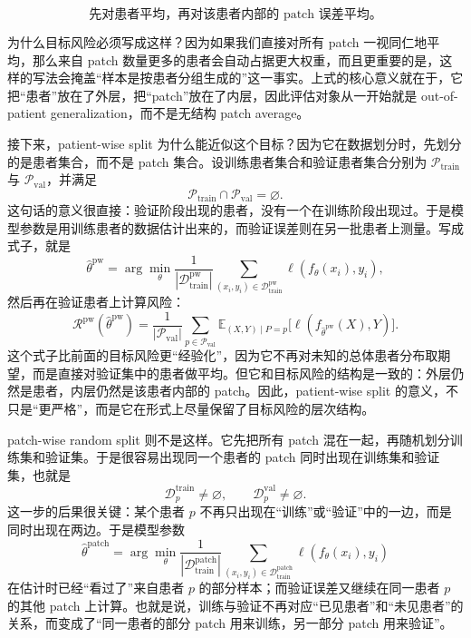 \begin{equation}
    \text{先对患者平均，再对该患者内部的 patch 误差平均。}
\end{equation}

为什么目标风险必须写成这样？因为如果我们直接对所有 patch 一视同仁地平均，那么来自 patch 数量更多的患者会自动占据更大权重，而且更重要的是，这样的写法会掩盖“样本是按患者分组生成的”这一事实。上式的核心意义就在于，它把“患者”放在了外层，把“patch”放在了内层，因此评估对象从一开始就是 out-of-patient generalization，而不是无结构 patch average。

接下来，patient-wise split 为什么能近似这个目标？因为它在数据划分时，先划分的是患者集合，而不是 patch 集合。设训练患者集合和验证患者集合分别为 $\mathcal{P}_{\mathrm{train}}$ 与 $\mathcal{P}_{\mathrm{val}}$，并满足
\begin{equation}
    \mathcal{P}_{\mathrm{train}} \cap \mathcal{P}_{\mathrm{val}} = \varnothing.
\end{equation}
这句话的意义很直接：验证阶段出现的患者，没有一个在训练阶段出现过。于是模型参数是用训练患者的数据估计出来的，而验证误差则在另一批患者上测量。写成式子，就是
\begin{equation}
    \hat{\theta}^{\mathrm{pw}}
    =
    \arg\min_{\theta}
    \frac{1}{|\mathcal{D}_{\mathrm{train}}^{\mathrm{pw}}|}
    \sum_{(x_i,y_i)\in\mathcal{D}_{\mathrm{train}}^{\mathrm{pw}}}
    \ell(f_{\theta}(x_i),y_i),
\end{equation}
然后再在验证患者上计算风险：
\begin{equation}
    \mathcal{R}^{\mathrm{pw}}(\hat{\theta}^{\mathrm{pw}})
    =
    \frac{1}{|\mathcal{P}_{\mathrm{val}}|}
    \sum_{p\in\mathcal{P}_{\mathrm{val}}}
    \mathbb{E}_{(X,Y)\mid P=p}
    \bigl[
        \ell(f_{\hat{\theta}^{\mathrm{pw}}}(X),Y)
        \bigr].
\end{equation}
这个式子比前面的目标风险更“经验化”，因为它不再对未知的总体患者分布取期望，而是直接对验证集中的患者做平均。但它和目标风险的结构是一致的：外层仍然是患者，内层仍然是该患者内部的 patch。因此，patient-wise split 的意义，不只是“更严格”，而是它在形式上尽量保留了目标风险的层次结构。

patch-wise random split 则不是这样。它先把所有 patch 混在一起，再随机划分训练集和验证集。于是很容易出现同一个患者的 patch 同时出现在训练集和验证集，也就是
\begin{equation}
    \mathcal{D}_{p}^{\mathrm{train}} \neq \varnothing,
    \qquad
    \mathcal{D}_{p}^{\mathrm{val}} \neq \varnothing.
\end{equation}
这一步的后果很关键：某个患者 $p$ 不再只出现在“训练”或“验证”中的一边，而是同时出现在两边。于是模型参数
\begin{equation}
    \hat{\theta}^{\mathrm{patch}}
    =
    \arg\min_{\theta}
    \frac{1}{|\mathcal{D}_{\mathrm{train}}^{\mathrm{patch}}|}
    \sum_{(x_i,y_i)\in\mathcal{D}_{\mathrm{train}}^{\mathrm{patch}}}
    \ell(f_{\theta}(x_i),y_i)
\end{equation}
在估计时已经“看过了”来自患者 $p$ 的部分样本；而验证误差又继续在同一患者 $p$ 的其他 patch 上计算。也就是说，训练与验证不再对应“已见患者”和“未见患者”的关系，而变成了“同一患者的部分 patch 用来训练，另一部分 patch 用来验证”。

